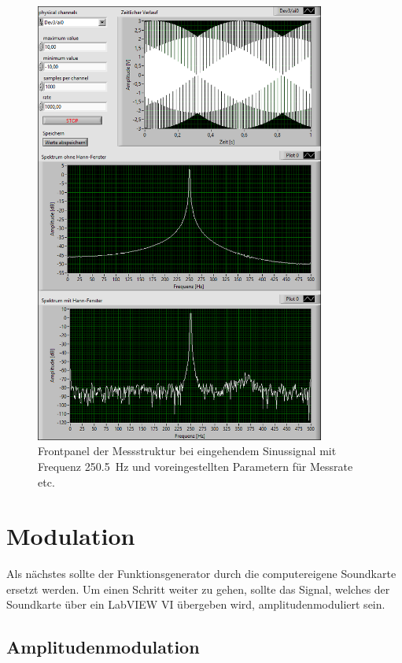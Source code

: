 		\begin{figure}[H]
			\centering
			\includegraphics[width=0.85\textwidth]{pic/abtast_250,5Hz.png}	
			\caption{Frontpanel der Messstruktur bei eingehendem Sinussignal mit Frequenz \SI{250,5}{\hertz} und voreingestellten Parametern für Messrate etc.}
			\label{fig:abtast_250,5Hz}
		\end{figure}

\newpage
\section{Modulation}
	
	Als nächstes sollte der Funktionsgenerator durch die computereigene Soundkarte ersetzt werden.
	Um einen Schritt weiter zu gehen, sollte das Signal, welches der Soundkarte über ein LabVIEW VI übergeben wird, amplitudenmoduliert sein.
	
	\subsection{Amplitudenmodulation}
	
